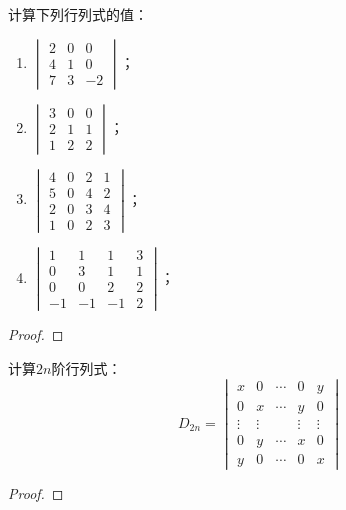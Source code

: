 \begin{problem}
计算下列行列式的值：
\begin{enumerate}
    \item \(\begin{vmatrix}2&0&0\\4&1&0\\7&3&-2\end{vmatrix}\)；
    \item \(\begin{vmatrix}3&0&0\\2&1&1\\1&2&2\end{vmatrix}\)；
    \item \(\begin{vmatrix}4&0&2&1\\5&0&4&2\\2&0&3&4\\1&0&2&3\end{vmatrix}\)；
    \item \(\begin{vmatrix}1&1&1&3\\0&3&1&1\\0&0&2&2\\-1&-1&-1&2\end{vmatrix}\)；
\end{enumerate}
\end{problem}
\begin{proof}
\end{proof}

\begin{problem}
计算\(2n\)阶行列式：
\begin{equation*}
    D_{2n}=
    \begin{vmatrix}
        x      & 0      & \cdots & 0      & y      \\
        0      & x      & \cdots & y      & 0      \\
        \vdots & \vdots &        & \vdots & \vdots \\
        0      & y      & \cdots & x      & 0      \\
        y      & 0      & \cdots & 0      & x
    \end{vmatrix}
\end{equation*}
\end{problem}
\begin{proof}
\end{proof}

